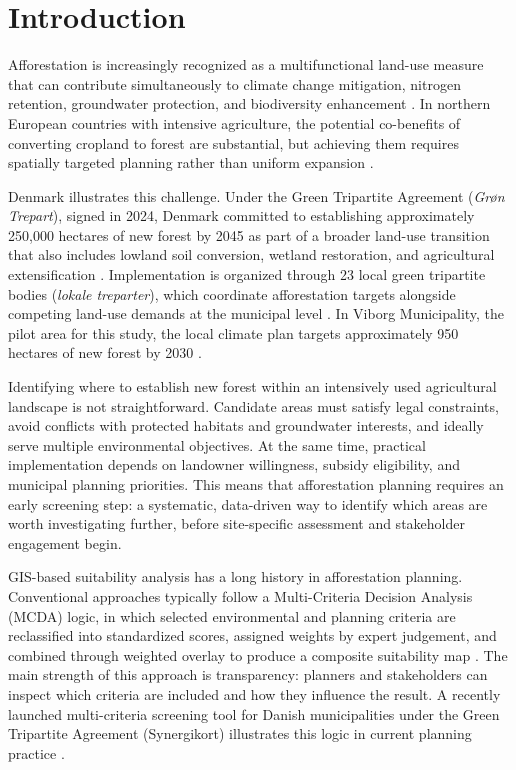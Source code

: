 \documentclass[land,article,submit,moreauthors]{Definitions/mdpi}
\begin{document}
\section{Introduction}


Afforestation is increasingly recognized as a multifunctional land-use measure that can contribute simultaneously to climate change mitigation, nitrogen retention, groundwater protection, and biodiversity enhancement \citep{gomes2023,joergensen2025}. In northern European countries with intensive agriculture, the potential co-benefits of converting cropland to forest are substantial, but achieving them requires spatially targeted planning rather than uniform expansion \citep{vanorshoven2005}.

Denmark illustrates this challenge. Under the Green Tripartite Agreement (\textit{Gr{\o}n Trepart}), signed in 2024, Denmark committed to establishing approximately 250,000 hectares of new forest by 2045 as part of a broader land-use transition that also includes lowland soil conversion, wetland restoration, and agricultural extensification \citep{regeringen2024a}. Implementation is organized through 23 local green tripartite bodies (\textit{lokale treparter}), which coordinate afforestation targets alongside competing land-use demands at the municipal level \citep{mgtp2026}. In Viborg Municipality, the pilot area for this study, the local climate plan targets approximately 950 hectares of new forest by 2030 \citep{viborg2022}.

Identifying where to establish new forest within an intensively used agricultural landscape is not straightforward. Candidate areas must satisfy legal constraints, avoid conflicts with protected habitats and groundwater interests, and ideally serve multiple environmental objectives. At the same time, practical implementation depends on landowner willingness, subsidy eligibility, and municipal planning priorities. This means that afforestation planning requires an early screening step: a systematic, data-driven way to identify which areas are worth investigating further, before site-specific assessment and stakeholder engagement begin.


GIS-based suitability analysis has a long history in afforestation planning. Conventional approaches typically follow a Multi-Criteria Decision Analysis (MCDA) logic, in which selected environmental and planning criteria are reclassified into standardized scores, assigned weights by expert judgement, and combined through weighted overlay to produce a composite suitability map \citep{gilliams2005,vanorshoven2005}. The main strength of this approach is transparency: planners and stakeholders can inspect which criteria are included and how they influence the result. A recently launched multi-criteria screening tool for Danish municipalities under the Green Tripartite Agreement (Synergikort) illustrates this logic in current planning practice \citep{galloe2025}.
\end{document}
